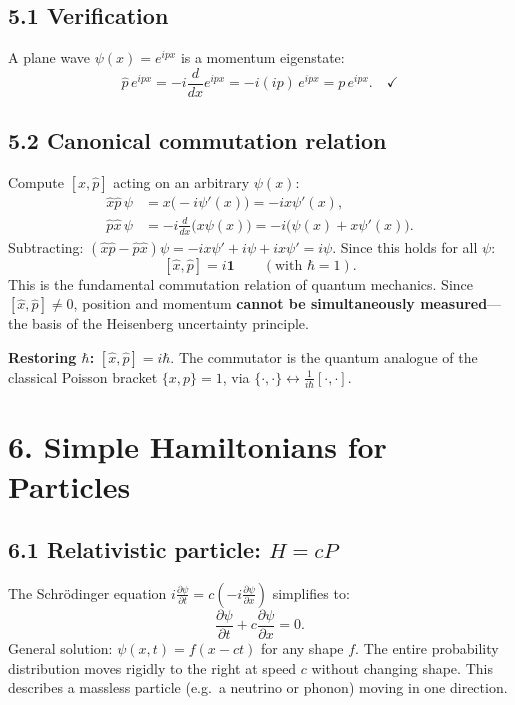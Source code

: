 \documentclass[12pt,a4paper]{article}
\begin{document}
\subsection{5.1 Verification}
A plane wave $\psi(x)=e^{ipx}$ is a momentum eigenstate:
\[
    \hat{p}\,e^{ipx} = -i\frac{d}{dx}e^{ipx} = -i(ip)\,e^{ipx} = p\,e^{ipx}. \quad\checkmark
\]

\subsection{5.2 Canonical commutation relation}
Compute $[\hat{x},\hat{p}]$ acting on an arbitrary $\psi(x)$:
\begin{align}
    \hat{x}\hat{p}\,\psi &= x\bigl(-i\psi'(x)\bigr) = -ix\psi'(x), \\
    \hat{p}\hat{x}\,\psi &= -i\frac{d}{dx}\bigl(x\psi(x)\bigr) = -i\bigl(\psi(x)+x\psi'(x)\bigr).
\end{align}
Subtracting: $(\hat{x}\hat{p}-\hat{p}\hat{x})\psi = -ix\psi'+i\psi+ix\psi' = i\psi$.  Since this holds for all $\psi$:
\[
    \boxed{[\hat{x},\hat{p}] = i\mathbf{1}} \qquad (\text{with } \hbar=1).
\]
This is the fundamental commutation relation of quantum mechanics.  Since $[\hat{x},\hat{p}]\neq 0$, position and momentum \textbf{cannot be simultaneously measured}---the basis of the Heisenberg uncertainty principle.

\noindent\textbf{Restoring $\hbar$:} $[\hat{x},\hat{p}]=i\hbar$.  The commutator is the quantum analogue of the classical Poisson bracket $\{x,p\}=1$, via $\{\cdot,\cdot\}\leftrightarrow\frac{1}{i\hbar}[\cdot,\cdot]$.

\section{6. Simple Hamiltonians for Particles}

\subsection{6.1 Relativistic particle: $H=cP$}
The Schr\"odinger equation $i\frac{\partial\psi}{\partial t}=c(-i\frac{\partial\psi}{\partial x})$ simplifies to:
\[
    \frac{\partial\psi}{\partial t} + c\frac{\partial\psi}{\partial x} = 0.
\]
General solution: $\psi(x,t)=f(x-ct)$ for any shape $f$.  The entire probability distribution moves rigidly to the right at speed $c$ without changing shape.  This describes a massless particle (e.g.\ a neutrino or phonon) moving in one direction.
\end{document}
